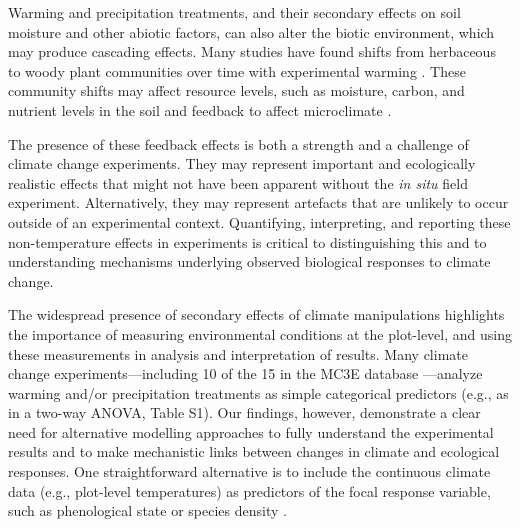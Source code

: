 \documentclass{article}
\begin{document}
\par Warming and precipitation treatments, and their secondary effects on soil moisture and other abiotic factors, can also alter the biotic environment, which may produce cascading effects. Many studies have found shifts from herbaceous to woody plant communities over time with experimental warming \citep[e.g.,][]{rollinson2012, mcdaniel2014,mcdaniel2014b, harte2015}. These community shifts may affect resource levels, such as moisture, carbon, and nutrient levels in the soil \citep{mcdaniel2014,mcdaniel2014b, harte2015} and feedback to affect microclimate \citep{harte2015}. 
\par The presence of these feedback effects is both a strength and a challenge of climate change experiments. They may represent important and ecologically realistic effects that might not have been apparent without the \emph{in situ} field experiment. Alternatively, they may represent artefacts that are unlikely to occur outside of an experimental context. Quantifying, interpreting, and reporting these non-temperature effects in experiments is critical to distinguishing this and to understanding mechanisms underlying observed biological responses to climate change. 

\par The widespread presence of secondary effects of climate manipulations highlights the importance of measuring environmental conditions at the plot-level, and using these measurements in analysis and interpretation of results. Many climate change experiments---including 10 of the 15 in the MC3E database
---analyze warming and/or precipitation treatments as simple categorical predictors (e.g., as in a two-way ANOVA, Table S1). Our findings, however, demonstrate a clear need for alternative modelling approaches to fully understand the experimental results and to make mechanistic links between changes in climate and ecological responses. One straightforward alternative is to include the continuous climate data (e.g., plot-level temperatures) as predictors of the focal response variable, such as phenological state or species density \citep [e.g.,][]{marchin2015, pelini2014}.%
\end{document}

